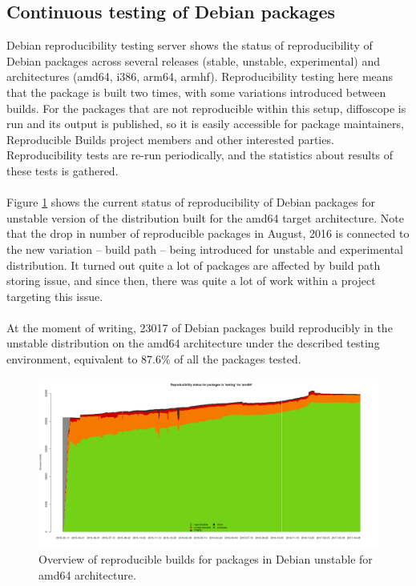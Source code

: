 {\subsection[Continuous testing of Debian packages]{Continuous testing of Debian packages} 
Debian reproducibility testing server \autocite{tests-rbo} shows the status of reproducibility of Debian packages across several releases (stable, unstable, experimental) and architectures (amd64, i386, arm64, armhf). Reproducibility testing here means that the package is built two times, with some variations introduced between builds. For the packages that are not reproducible within this setup, diffoscope is run and its output is published, so it is easily accessible for package maintainers, Reproducible Builds project members and other interested parties. Reproducibility tests are re-run periodically, and the statistics about results of these tests is gathered.\\\\
Figure \ref{fig:stats_sid} shows the current status of reproducibility of Debian packages for unstable version of the distribution built for the amd64 target architecture. Note that the drop in number of reproducible packages in August, 2016 is connected to the new variation -- build path -- being introduced for unstable and experimental distribution. It turned out quite a lot of packages are affected by build path storing issue, and since then, there was quite a lot of work within a project targeting this issue.\\\\
At the moment of writing, 23017 of Debian packages build reproducibly in the unstable distribution on the amd64 architecture under the described testing environment, equivalent to 87.6\% of all the packages tested.
\FloatBarrier
\begin{figure}[h]
\centering
\includegraphics[width=1.05\textwidth]{fig/stats_pkg_state.png}
\caption{\label{fig:stats_sid}Overview of reproducible builds for packages in Debian unstable for amd64 architecture. \autocite{tests-rbo}}
\end{figure}
}
